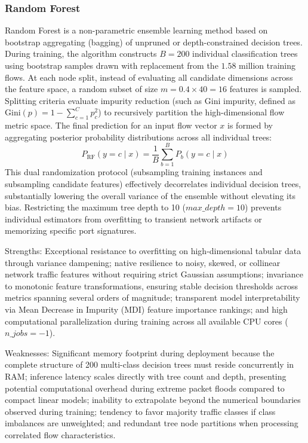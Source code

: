 \documentclass[12pt,a4paper]{report}
\begin{document}
\subsubsection*{Random Forest}

Random Forest is a non-parametric ensemble learning method based on bootstrap aggregating (bagging) of unpruned or depth-constrained decision trees. During training, the algorithm constructs $B = 200$ individual classification trees using bootstrap samples drawn with replacement from the $1.58$ million training flows. At each node split, instead of evaluating all candidate dimensions across the feature space, a random subset of size $m = 0.4 \times 40 = 16$ features is sampled. Splitting criteria evaluate impurity reduction (such as Gini impurity, defined as $\text{Gini}(p) = 1 - \sum_{c=1}^{C} p_c^2$) to recursively partition the high-dimensional flow metric space. The final prediction for an input flow vector $x$ is formed by aggregating posterior probability distributions across all individual trees:
\begin{equation}
P_{\text{RF}}(y = c \mid x) = \frac{1}{B} \sum_{b=1}^{B} P_b(y = c \mid x)
\end{equation}
This dual randomization protocol (subsampling training instances and subsampling candidate features) effectively decorrelates individual decision trees, substantially lowering the overall variance of the ensemble without elevating its bias. Restricting the maximum tree depth to 10 ($max\_depth = 10$) prevents individual estimators from overfitting to transient network artifacts or memorizing specific port signatures.

Strengths: Exceptional resistance to overfitting on high-dimensional tabular data through variance dampening; native resilience to noisy, skewed, or collinear network traffic features without requiring strict Gaussian assumptions; invariance to monotonic feature transformations, ensuring stable decision thresholds across metrics spanning several orders of magnitude; transparent model interpretability via Mean Decrease in Impurity (MDI) feature importance rankings; and high computational parallelization during training across all available CPU cores ($n\_jobs = -1$).

Weaknesses: Significant memory footprint during deployment because the complete structure of 200 multi-class decision trees must reside concurrently in RAM; inference latency scales directly with tree count and depth, presenting potential computational overhead during extreme packet floods compared to compact linear models; inability to extrapolate beyond the numerical boundaries observed during training; tendency to favor majority traffic classes if class imbalances are unweighted; and redundant tree node partitions when processing correlated flow characteristics.
\end{document}
